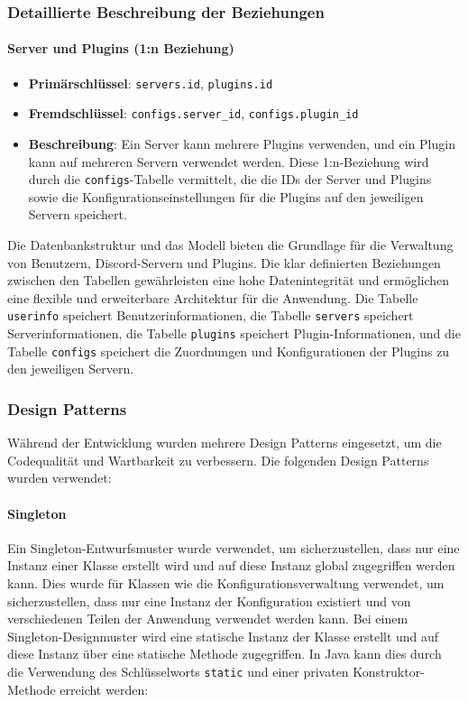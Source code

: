 \subsubsection{Detaillierte Beschreibung der Beziehungen}\label{detaillierte-beschreibung-der-beziehungen}

\paragraph{Server und Plugins (1:n Beziehung)}\label{server-und-plugins-1n-beziehung}

\begin{itemize}
\item
  \textbf{Primärschlüssel}: \texttt{servers.id}, \texttt{plugins.id}
\item
  \textbf{Fremdschlüssel}: \texttt{configs.server\_id}, \texttt{configs.plugin\_id}
\item
  \textbf{Beschreibung}: Ein Server kann mehrere Plugins verwenden, und ein Plugin kann auf mehreren Servern verwendet werden. Diese 1:n-Beziehung wird durch die \texttt{configs}-Tabelle vermittelt, die die IDs der Server und Plugins sowie die Konfigurationseinstellungen für die Plugins auf den jeweiligen Servern speichert.
\end{itemize}

Die Datenbankstruktur und das Modell bieten die Grundlage für die Verwaltung von Benutzern, Discord-Servern und Plugins. Die klar definierten Beziehungen zwischen den Tabellen gewährleisten eine hohe Datenintegrität und ermöglichen eine flexible und erweiterbare Architektur für die Anwendung. Die Tabelle \texttt{userinfo} speichert Benutzerinformationen, die Tabelle \texttt{servers} speichert Serverinformationen, die Tabelle \texttt{plugins} speichert Plugin-Informationen, und die Tabelle \texttt{configs} speichert die Zuordnungen und Konfigurationen der Plugins zu den jeweiligen Servern.

\subsubsection{Design Patterns}\label{design-patterns}

Während der Entwicklung wurden mehrere \gls{Design Patterns} eingesetzt, um die Codequalität und Wartbarkeit zu verbessern. Die folgenden Design Patterns wurden verwendet:

\paragraph{Singleton}\label{singleton} Ein Singleton-Entwurfsmuster wurde verwendet, um sicherzustellen, dass nur eine Instanz einer Klasse erstellt wird und auf diese Instanz global zugegriffen werden kann. Dies wurde für Klassen wie die Konfigurationsverwaltung verwendet, um sicherzustellen, dass nur eine Instanz der Konfiguration existiert und von verschiedenen Teilen der Anwendung verwendet werden kann. Bei einem Singleton-Designmuster wird eine statische Instanz der Klasse erstellt und auf diese Instanz über eine statische Methode zugegriffen. In Java kann dies durch die Verwendung des Schlüsselworts \texttt{static} und einer privaten Konstruktor-Methode erreicht werden:

